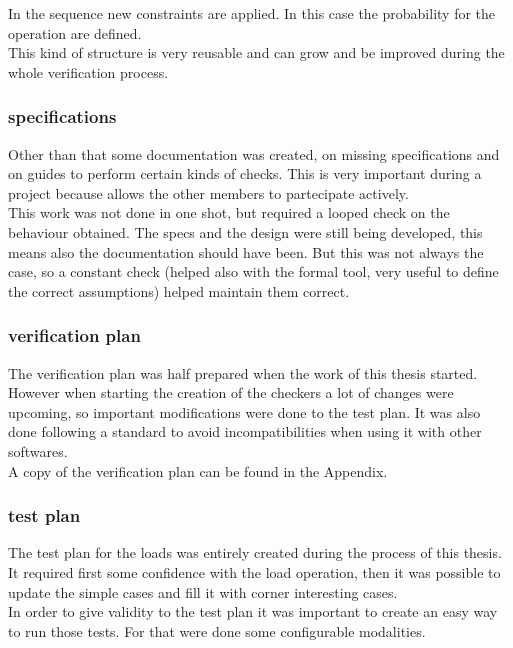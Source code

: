 In the sequence new constraints are applied. In this case the probability for the operation are defined.\\

This kind of structure is very reusable and can grow and be improved during the whole verification process.\\

\subsubsection{specifications}
Other than that some documentation was created, on missing specifications and on guides to perform certain kinds of checks. This is very important during a project because allows the other members to partecipate actively.\\

This work was not done in one shot, but required a looped check on the behaviour obtained. The specs and the design were still being developed, this means also the documentation should have been. But this was not always the case, so a constant check (helped also with the formal tool, very useful to define the correct assumptions) helped maintain them correct.\\

\subsubsection{verification plan}
The verification plan was half prepared when the work of this thesis started. However when starting the creation of the checkers a lot of changes were upcoming, so important modifications were done to the test plan. It was also done following a standard to avoid incompatibilities when using it with other softwares.\\
A copy of the verification plan can be found in the Appendix.\\

\subsubsection{test plan}
The test plan for the loads was entirely created during the process of this thesis. It required first some confidence with the load operation, then it was possible to update the simple cases and fill it with corner interesting cases.\\

In order to give validity to the test plan it was important to create an easy way to run those tests. For that were done some configurable modalities.\\

